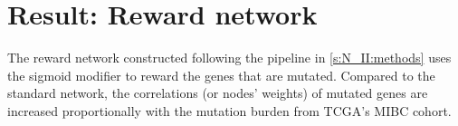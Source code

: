 \section{Result: Reward network} \label{s:N_II:rwd}

\vspace{3mm}
\vspace{3mm}

The reward network constructed following the pipeline in \cref{s:N_II:methods} uses the sigmoid modifier to reward the genes that are mutated. Compared to the standard network, the correlations (or nodes' weights) of mutated genes are increased proportionally with the mutation burden from TCGA's MIBC cohort. 


